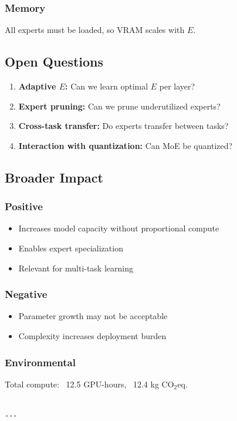 \subsubsection{Memory}
All experts must be loaded, so VRAM scales with $E$.

\subsection{Open Questions}

\begin{enumerate}
\item \textbf{Adaptive $E$:} Can we learn optimal $E$ per layer?
\item \textbf{Expert pruning:} Can we prune underutilized experts?
\item \textbf{Cross-task transfer:} Do experts transfer between tasks?
\item \textbf{Interaction with quantization:} Can MoE be quantized?

\end{enumerate}
\subsection{Broader Impact}

\subsubsection{Positive}
\begin{itemize}
\item Increases model capacity without proportional compute
\item Enables expert specialization
\item Relevant for multi-task learning

\end{itemize}
\subsubsection{Negative}
\begin{itemize}
\item Parameter growth may not be acceptable
\item Complexity increases deployment burden

\end{itemize}
\subsubsection{Environmental}
Total compute: ~12.5 GPU-hours, ~12.4 kg CO$_2$eq.
\begin{lstlisting}

---
\end{lstlisting}

